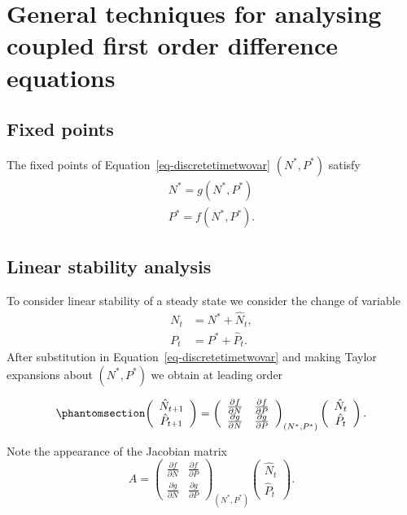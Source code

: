 \documentclass[
  letterpaper,
  DIV=11,
  numbers=noendperiod]{scrreprt}
\begin{document}
\section{General techniques for analysing coupled first order difference
equations}\label{general-techniques-for-analysing-coupled-first-order-difference-equations}

\subsection{Fixed points}\label{fixed-points-3}

The fixed points of Equation~\ref{eq-discretetimetwovar} \((N^*,P^*)\)
satisfy \[
\begin{aligned}
N^*=g(N^*,P^*) \nonumber \\
P^*=f(N^*,P^*).
\end{aligned}
\]

\subsection{Linear stability
analysis}\label{linear-stability-analysis-1}

To consider linear stability of a steady state we consider the change of
variable \[
\begin{aligned}
N_t&=N^*+\hat{N}_{t},   \nonumber\\
P_t&=P^*+\hat{P}_{t}.  \nonumber
\end{aligned}
\] After substitution in Equation~\ref{eq-discretetimetwovar} and making
Taylor expansions about \((N^*,P^*)\) we obtain at leading order

\begin{equation}\protect\phantomsection\label{eq-discretetimesecondorderdiff}{
\left(\begin{array}{c}
\hat{N}_{t+1} \\ \hat{P}_{t+1}\end{array}\right) = \left(\begin{array}{rr}
\frac{\partial f}{\partial N}&\frac{\partial f}{\partial P} \\ \frac{\partial g}{\partial N }&\frac{\partial g}{\partial P} \end{array}\right)_{(N^*,P^*)} \left(\begin{array}{c} \hat{N}_{t} \\ \hat{P}_{t}\end{array}\right).
}\end{equation}

Note the appearance of the Jacobian matrix \[
A= \left(\begin{array}{rr}
\frac{\partial f}{\partial N}&\frac{\partial f}{\partial P} \\ \frac{\partial g}{\partial N }&\frac{\partial g}{\partial P} \end{array}\right)_{(N^*,P^*)} \left(\begin{array}{c} \hat{N}_{t} \\ \hat{P}_{t}\end{array}\right).
\]
\end{document}
